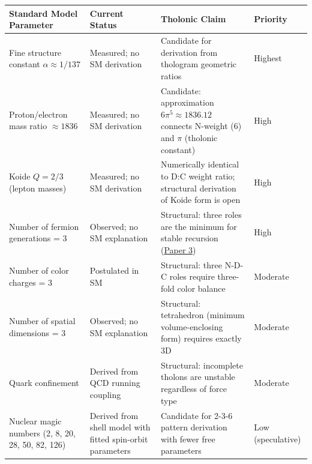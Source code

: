 \documentclass[
  11pt,
  letterpaper,
]{article}
\begin{document}
\begin{longtable}[]{@{}
  >{\raggedright\arraybackslash}p{}
  >{\raggedright\arraybackslash}p{}
  >{\raggedright\arraybackslash}p{}
  >{\raggedright\arraybackslash}p{}@{}}
\toprule\noalign{}
\begin{minipage}[b]{\linewidth}\raggedright
Standard Model Parameter
\end{minipage} & \begin{minipage}[b]{\linewidth}\raggedright
Current Status
\end{minipage} & \begin{minipage}[b]{\linewidth}\raggedright
Tholonic Claim
\end{minipage} & \begin{minipage}[b]{\linewidth}\raggedright
Priority
\end{minipage} \\
\midrule\noalign{}
\endhead
\bottomrule\noalign{}
\endlastfoot
Fine structure constant \(\alpha \approx 1/137\) & Measured; no SM
derivation & Candidate for derivation from thologram geometric ratios &
Highest \\
Proton/electron mass ratio \(\approx 1836\) & Measured; no SM derivation
& Candidate: approximation \(6\pi^5 \approx 1836.12\) connects N-weight
(6) and \(\pi\) (tholonic constant) & High \\
Koide \(Q = 2/3\) (lepton masses) & Measured; no SM derivation &
Numerically identical to D:C weight ratio; structural derivation of
Koide form is open & High \\
Number of fermion generations = 3 & Observed; no SM explanation &
Structural: three roles are the minimum for stable recursion
(\href{https://github.com/baardev/truevalue/blob/main/docnav/Research/papers/3_minimal-recursive-triadic-framework/3_minimal-recursive-triadic-framework.pdf}{Paper
3}) & High \\
Number of color charges = 3 & Postulated in SM & Structural: three N-D-C
roles require three-fold color balance & Moderate \\
Number of spatial dimensions = 3 & Observed; no SM explanation &
Structural: tetrahedron (minimum volume-enclosing form) requires exactly
3D & Moderate \\
Quark confinement & Derived from QCD running coupling & Structural:
incomplete tholons are unstable regardless of force type & Moderate \\
Nuclear magic numbers (2, 8, 20, 28, 50, 82, 126) & Derived from shell
model with fitted spin-orbit parameters & Candidate for 2-3-6 pattern
derivation with fewer free parameters & Low (speculative) \\
\end{longtable}
\end{document}
